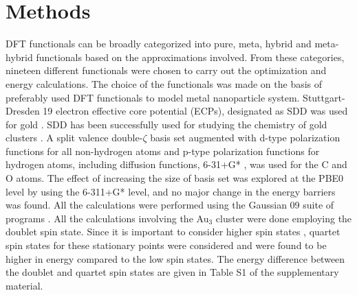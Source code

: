 \section{Methods}
DFT functionals can be broadly categorized into pure, meta, hybrid and meta-hybrid functionals based on the approximations involved. From these categories, nineteen different functionals were chosen to carry out the optimization and energy calculations. The choice of the functionals was made on the basis of preferably used DFT functionals to model metal nanoparticle system.  Stuttgart-Dresden 19 electron effective core potential (ECPs), designated as SDD was used for gold \cite{Ehlers1993,dolg1987,andrae1990,eva2006}. SDD has been successfully used for studying the chemistry of gold clusters \cite{andrews2004gold,hou2005evaluation,dos2012exploring,fan2012dft,faza2011performance}. A split valence double-$\zeta$ basis set augmented with d-type polarization functions for all non-hydrogen atoms and p-type polarization functions for hydrogen atoms, including diffusion functions, 6-31+G* \cite{hariharan1974,Hariharan1972,pople2001,hehre1972}, was used for the C and O atoms. The effect of increasing the size of basis set was explored at the PBE0 level by using the 6-311+G* level, and  no major change in the energy barriers was found. All the calculations were performed using the Gaussian 09 suite of programs \cite{g09}. All the calculations involving the Au$_3$ cluster were done employing the doublet spin state. Since it is important to consider higher spin states \cite{Presti2009,Presti2013, Schroder2000}, quartet spin states for these stationary points were considered and were found to be higher in energy compared to the low spin states. The energy difference between the doublet and quartet spin states are given in Table S1 of the supplementary material.\\
